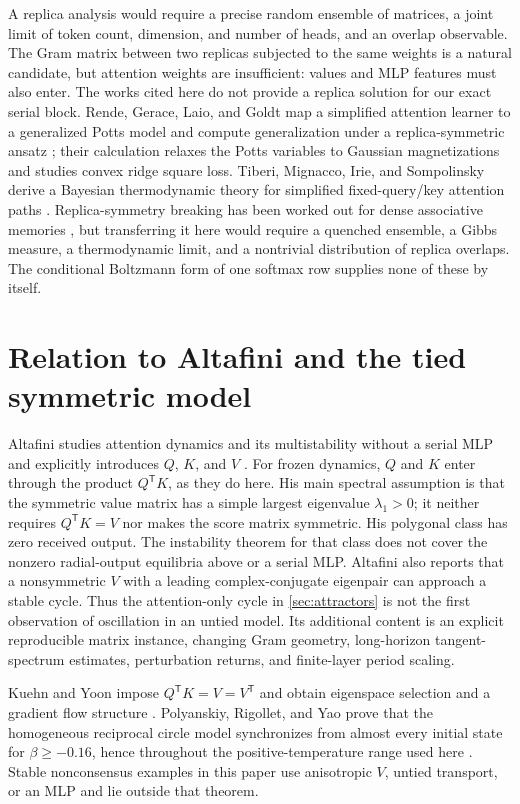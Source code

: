 \documentclass[11pt,a4paper]{article}
\theoremstyle{definition}
\newcommand{\T}{\mathsf T}
\begin{document}
A replica analysis would require a precise random ensemble of matrices, a joint limit
of token count, dimension, and number of heads, and an overlap observable. The Gram
matrix between two replicas subjected to the same weights is a natural candidate, but
attention weights are insufficient: values and MLP features must also enter. The
works cited here do not provide a replica solution for our exact serial block.  Rende,
Gerace, Laio, and Goldt map a simplified attention learner to a
generalized Potts model and compute generalization under a replica-symmetric ansatz
\cite{rende2024potts}; their calculation relaxes the Potts variables to Gaussian
magnetizations and studies convex ridge square loss.  Tiberi, Mignacco, Irie, and
Sompolinsky derive a Bayesian thermodynamic theory for simplified fixed-query/key
attention paths \cite{tiberi2024interplay}.  Replica-symmetry breaking has been worked
out for dense associative memories \cite{albanese2021rsb}, but transferring it here
would require a quenched ensemble, a Gibbs measure, a thermodynamic limit, and a
nontrivial distribution of replica overlaps.  The conditional Boltzmann form of one
softmax row supplies none of these by itself.

\section{Relation to Altafini and the tied symmetric model}
\label{sec:new}

Altafini studies attention dynamics and its multistability without a serial MLP and
explicitly introduces $Q$, $K$, and $V$ \cite{altafini2025multistability}.  For frozen
dynamics, $Q$ and $K$ enter through the product $Q^{\T}K$, as they do here.  His main
spectral assumption is that the symmetric value matrix has a simple largest
eigenvalue $\lambda_1>0$; it neither requires $Q^{\T}K=V$ nor makes the score matrix
symmetric.  His polygonal class has zero received output.  The instability theorem
for that class does not cover the nonzero radial-output equilibria above or a serial
MLP.  Altafini also reports that a nonsymmetric $V$ with a leading complex-conjugate
eigenpair can approach a stable cycle.  Thus the attention-only cycle in
\cref{sec:attractors} is not the first observation of oscillation in an untied model.
Its additional content is an explicit reproducible matrix instance, changing Gram
geometry, long-horizon tangent-spectrum estimates, perturbation returns, and finite-layer
period scaling.

Kuehn and Yoon impose $Q^{\T}K=V=V^{\T}$ and obtain eigenspace selection and a gradient
flow structure \cite{kuehnyoon2026spectral}.  Polyanskiy, Rigollet, and Yao prove that
the homogeneous reciprocal circle model synchronizes from almost every initial state
for $\beta\geq-0.16$, hence throughout the positive-temperature range used here
\cite{polyanskiy2025circle}.  Stable nonconsensus examples in this paper use
anisotropic $V$, untied transport, or an MLP and lie outside that theorem.
\end{document}

